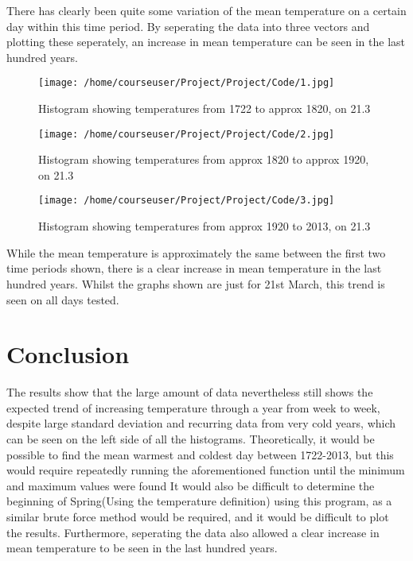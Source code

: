 \documentclass[a4paper,10pt,oneside]{article}
\begin{document}
There has clearly been quite some variation of the mean temperature on a certain day within
this time period. By seperating the data into three vectors and plotting these seperately, an increase
in mean temperature can be seen in the last hundred years.
\begin{figure}[!ht]
 \texttt{[image: /home/courseuser/Project/Project/Code/1.jpg]}
 \caption{Histogram showing temperatures from 1722 to approx 1820, on 21.3}
 \label{fig:one}
\end{figure}

\begin{figure}[!ht]
 \texttt{[image: /home/courseuser/Project/Project/Code/2.jpg]}
 \caption{Histogram showing temperatures from approx 1820 to approx 1920, on 21.3}
 \label{fig:two}
\end{figure}

\begin{figure}[!ht]
 \texttt{[image: /home/courseuser/Project/Project/Code/3.jpg]}
 \caption{Histogram showing temperatures from approx 1920 to 2013, on 21.3}
 \label{fig:three}
\end{figure}

While the mean temperature is approximately the same between the first two time periods
shown, there is a clear increase in mean temperature in the last hundred years. Whilst the graphs
shown are just for 21st March, this trend is seen on all days tested.


\section{Conclusion}
\label{sec:conc}

The results show that the large amount of data nevertheless still shows the expected trend of increasing temperature through a year from week
to week, despite large standard deviation and recurring data from very cold years, which can be seen on
the left side of all the histograms. Theoretically, it would be possible to find the mean warmest and coldest day between 1722-2013,
but this would require repeatedly running the aforementioned function until the minimum and maximum values were found
It would also be difficult to determine the beginning of Spring(Using the temperature definition) using this program,
as a similar brute force method would be required, and it would be difficult to plot the results. Furthermore, seperating
the data also allowed a clear increase in mean temperature to be seen in the last hundred years.






 
\end{document}
